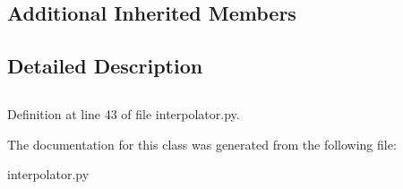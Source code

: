 \subsection*{Additional Inherited Members}


\subsection{Detailed Description}
\paragraph*{}

\subsection*{}

\subsection*{}

\subsection*{}

\subsection*{}

\subsection*{}

\subparagraph*{}

Definition at line 43 of file interpolator.\+py.



The documentation for this class was generated from the following file\+:\begin{DoxyCompactItemize}
\item 
interpolator.\+py\end{DoxyCompactItemize}
